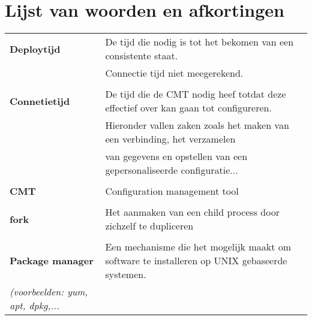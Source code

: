 


\chapter*{Lijst van woorden en afkortingen}

\begin{tabular}{l  l }
\textbf{Deploytijd} & De tijd die nodig is tot het bekomen van een consistente staat. \\ &Connectie tijd niet meegerekend. \\ \\
\textbf{Connetietijd} & De tijd die de CMT nodig heef totdat deze effectief over kan gaan tot configureren. \\ &  Hieronder vallen zaken zoals het maken van een verbinding, het verzamelen  \\ & van gegevens en opstellen van een gepersonaliseerde configuratie... \\ \\
\textbf{CMT} & Configuration management tool \\ \\
\textbf{fork} & Het aanmaken van een child process door zichzelf te dupliceren \autocite{forkmeaning} \\ \\
\textbf{Package manager} & Een mechanisme die het mogelijk maakt om software te installeren op UNIX gebaseerde systemen.\\ \textit{(voorbeelden: yum, apt, dpkg,...} \\
\end{tabular}